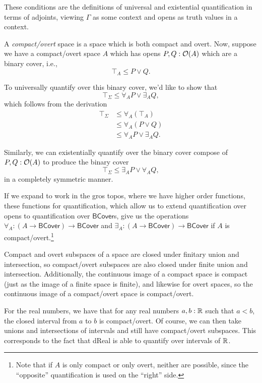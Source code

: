 These conditions are the definitions of universal and existential quantification in terms of adjoints, viewing $\Gamma$ as some context and opens as truth values in a context.

A \emph{compact/overt} space is a space which is both compact and overt. Now, suppose we have a compact/overt space $A$ which has opens $P, Q : \mathcal{O}({A})$ which are a binary cover, i.e.,
\[
\top_A \le P \vee Q.
\]

To universally quantify over this binary cover, we'd like to show that
\[
\top_\Sigma \le \forall_A P \vee \exists_A Q,
\]
which follows from the derivation
\begin{align*}
\top_\Sigma 
  &\le \forall_A (\top_A)
\\ &\le \forall_A(P \vee Q)  \tag{since $\top_A \le P \vee Q$}
\\ &\le \forall_A P \vee \exists_A Q.
\end{align*}

Similarly, we can existentially quantify over the binary cover compose of $P, Q : \mathcal{O}({A})$ to produce the binary cover
\[
\top_\Sigma \le \exists_A P \vee \forall_A Q,
\]
in a completely symmetric manner.

If we expand to work in the gros topos, where we have higher order functions, these functions for quantification, which allow us to extend quantification over opens to quantification over $\mathsf{BCover}$s, give us the operations $\forall_A : (A \to \mathsf{BCover}) \to \mathsf{BCover}$ and $\exists_A : (A \to \mathsf{BCover}) \to \mathsf{BCover}$ if $A$ is compact/overt.\footnote{Note that if $A$ is only compact or only overt, neither are possible, since the ``opposite'' quantification is used on the ``right'' side.}

Compact and overt subspaces of a space are closed under finitary union and intersection, so compact/overt subspaces are also closed under finite union and intersection. Additionally, the continuous image of a compact space is compact (just as the image of a finite space is finite), and likewise for overt spaces, so the continuous image of a compact/overt space is compact/overt.

For the real numbers, we have that for any real numbers $a, b : \mathbb{R}$ such that $a < b$, the closed interval from $a$ to $b$ is compact/overt. Of course, we can then take unions and intersections of intervals and still have compact/overt subspaces. This corresponds to the fact that dReal is able to quantify over intervals of $\mathbb{R}$.

